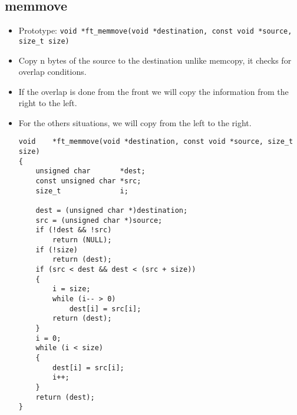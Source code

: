 \documentclass{article}
\begin{document}
		\subsection{memmove}
			\begin{itemize}[label=$\rightarrow$]
				\item Prototype: \texttt{void    *ft\_memmove(void *destination, const void *source, size\_t size)}
				\item Copy n bytes of the source to the destination unlike memcopy, it checks for overlap conditions.
				\item If the overlap is done from the front we will copy the information from the right to the left.
				\item For the others situations, we will copy from the left to the right.
				\begin{verbatim}
void    *ft_memmove(void *destination, const void *source, size_t size)         
{                                                                               
    unsigned char       *dest;                                                  
    const unsigned char *src;                                                   
    size_t              i;                                                      
                                                                                
    dest = (unsigned char *)destination;                                        
    src = (unsigned char *)source;                                              
    if (!dest && !src)                                                          
        return (NULL);                                                          
    if (!size)                                                                  
        return (dest);                                                          
    if (src < dest && dest < (src + size))                                      
    {                                                                           
        i = size;                                                               
        while (i-- > 0)                                                         
            dest[i] = src[i];                                                   
        return (dest);                                                          
    }                                                                           
    i = 0;                                                                      
    while (i < size)                                                            
    {                                                                           
        dest[i] = src[i];                                                       
        i++;                                                                    
    }                                                                           
    return (dest);                                                              
} 
				\end{verbatim}
			\end{itemize}
		
\end{document}
